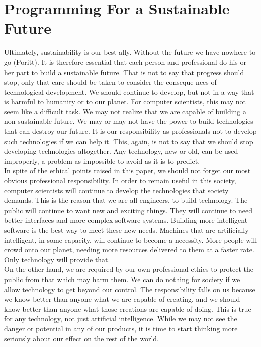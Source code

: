 \section{Programming For a Sustainable Future}
Ultimately, sustainability is our best ally. Without the future we have nowhere to
go (Poritt). It is therefore essential that each person and professional do his or her part to
build a sustainable future. That is not to say that progress should stop, only that care
should be taken to consider the conseque nces of technological development. We should
continue to develop, but not in a way that is harmful to humanity or to our planet. For
computer scientists, this may not seem like a difficult task. We may not realize that we
are capable of building a non-sustainable future. We may or may not have the power to
build technologies that can destroy our future. It is our responsibility as professionals not
to develop such technologies if we can help it. This, again, is not to say that we should
stop developing technologies altogether. Any technology, new or old, can be used
improperly, a problem as impossible to avoid as it is to predict.\\
In spite of the ethical points raised in this paper, we should not forget our most
obvious professional responsibility. In order to remain useful in this society, computer
scientists will continue to develop the technologies that society demands. This is the
reason that we are all engineers, to build technology. The public will continue to want new and exciting things. They will continue to need better interfaces and more complex
software systems. Building more intelligent software is the best way to meet these new
needs. Machines that are artificially intelligent, in some capacity, will continue to
become a necessity. More people will crowd onto our planet, needing more resources
delivered to them at a faster rate. Only technology will provide that.\\
On the other hand, we are required by our own professional ethics to protect the
public from that which may harm them. We can do nothing for society if we allow
technology to get beyond our control. The responsibility falls on us because we know
better than anyone what we are capable of creating, and we should know better than
anyone what those creations are capable of doing. This is true for any technology, not
just artificial intelligence. While we may not see the danger or potential in any of our
products, it is time to start thinking more seriously about our effect on the rest of the
world.\\

